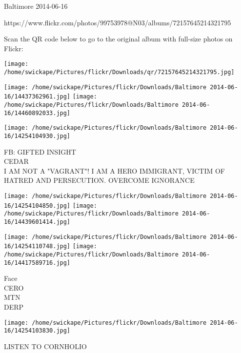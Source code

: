 \documentclass[10pt,letterpaper]{article}
\begin{document}
Baltimore 2014-06-16

https://www.flickr.com/photos/99753978@N03/albums/72157645214321795

Scan the QR code below to go to the original album with full-size photos on Flickr:

\texttt{[image: /home/swickape/Pictures/flickr/Downloads/qr/72157645214321795.jpg]}
\pagebreak

\texttt{[image: /home/swickape/Pictures/flickr/Downloads/Baltimore 2014-06-16/14437362961.jpg]}
\texttt{[image: /home/swickape/Pictures/flickr/Downloads/Baltimore 2014-06-16/14460892033.jpg]}

\vspace{0.25in}
\texttt{[image: /home/swickape/Pictures/flickr/Downloads/Baltimore 2014-06-16/14254104930.jpg]}

FB: GIFTED INSIGHT\\
CEDAR\\
I AM NOT A "VAGRANT"!  I AM A HERO IMMIGRANT, VICTIM OF HATRED AND PERSECUTION.  OVERCOME IGNORANCE\\
\pagebreak

\texttt{[image: /home/swickape/Pictures/flickr/Downloads/Baltimore 2014-06-16/14254104850.jpg]}
\texttt{[image: /home/swickape/Pictures/flickr/Downloads/Baltimore 2014-06-16/14439601414.jpg]}

\texttt{[image: /home/swickape/Pictures/flickr/Downloads/Baltimore 2014-06-16/14254110748.jpg]}
\texttt{[image: /home/swickape/Pictures/flickr/Downloads/Baltimore 2014-06-16/14417589716.jpg]}

Face\\
CERO\\
MTN\\
DERP\\
\pagebreak

\texttt{[image: /home/swickape/Pictures/flickr/Downloads/Baltimore 2014-06-16/14254103830.jpg]}

LISTEN TO CORNHOLIO\\
\pagebreak
\end{document}
